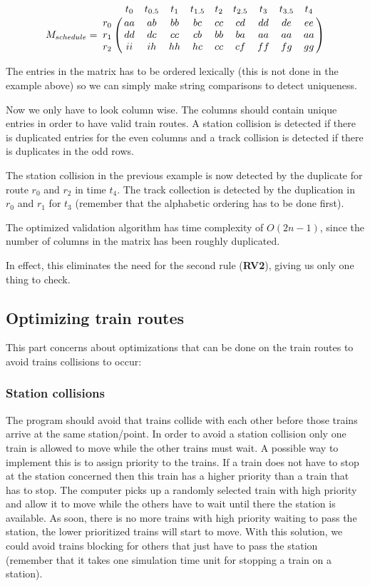 \documentclass[10pt,a4paper]{article}
\begin{document}
\begin{equation}
M_{schedule} = \bordermatrix{
                    ~ & t_0 & t_{0.5} & t_1 & t_{1.5} & t_2 & t_{2.5} & t_3 & t_{3.5} & t_4 \cr
                  r_0 & aa  &  ab     & bb  &  bc     & cc  &  cd     & dd  & de      & ee\cr
                  r_1 & dd  &  dc     & cc  &  cb     & bb  &  ba     & aa  & aa      & aa\cr
                  r_2 & ii  &  ih     & hh  &  hc     & cc  &  cf     & ff  & fg      & gg}
\end{equation}

The entries in the matrix has to be ordered lexically (this is not done in the example above) so we can simply make string comparisons to detect uniqueness.

 
Now we only have to look column wise. The columns should contain unique entries in order to have valid train routes.
A station collision is detected if there is duplicated entries for the even columns and a track collision is detected if there is duplicates in the odd rows.
 
The station collision in the previous example is now detected by the duplicate for route $r_0$ and $r_2$ in time $t_4$.
The track collection is detected by the duplication in $r_0$ and $r_1$ for $t_3$ (remember that the alphabetic ordering has to be done first).
 
The optimized validation algorithm has time complexity of $O(2n-1)$, since the number of columns in the matrix has been roughly duplicated.

In effect, this eliminates the need for the second rule (\textbf{RV2}), giving us only one thing to check.

\subsection{Optimizing train routes}
 
This part concerns about optimizations that can be done on the train routes to avoid trains collisions to occur:
 
\subsubsection{Station collisions}
 
The program should avoid that trains collide with each other before those trains arrive at the same station/point. In order to avoid a station collision only one train is allowed to move while the other trains must wait. A possible way to implement this is to assign priority to the trains. If a train does not have to stop at the station concerned then this train has a higher priority than a train that has to stop. The computer picks up a randomly selected train with high priority and allow it to move while the others have to wait until there the station is available. As soon, there is no more trains with high priority waiting to pass the station, the lower prioritized trains will start to move.
With this solution, we could avoid trains blocking for others that just have to pass the station (remember that it takes one simulation time unit for stopping a train on a station).
 
\end{document}
